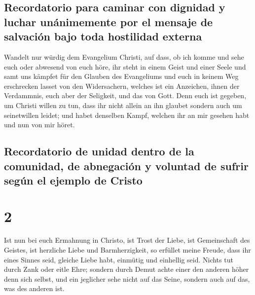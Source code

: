 \hypertarget{recordatorio-para-caminar-con-dignidad-y-luchar-unuxe1nimemente-por-el-mensaje-de-salvaciuxf3n-bajo-toda-hostilidad-externa}{%
\subsection{Recordatorio para caminar con dignidad y luchar unánimemente
por el mensaje de salvación bajo toda hostilidad
externa}\label{recordatorio-para-caminar-con-dignidad-y-luchar-unuxe1nimemente-por-el-mensaje-de-salvaciuxf3n-bajo-toda-hostilidad-externa}}

 Wandelt nur würdig dem Evangelium Christi, auf dass, ob
ich komme und sehe euch oder abwesend von euch höre, ihr steht in einem
Geist und einer Seele und samt uns kämpfet für den Glauben des
Evangeliums  und euch in keinem Weg erschrecken lasset
von den Widersachern, welches ist ein Anzeichen, ihnen der Verdammnis,
euch aber der Seligkeit, und das von Gott.  Denn euch ist
gegeben, um Christi willen zu tun, dass ihr nicht allein an ihn glaubet
sondern auch um seinetwillen leidet;  und habet denselben
Kampf, welchen ihr an mir gesehen habt und nun von mir höret.

\hypertarget{recordatorio-de-unidad-dentro-de-la-comunidad-de-abnegaciuxf3n-y-voluntad-de-sufrir-seguxfan-el-ejemplo-de-cristo}{%
\subsection{Recordatorio de unidad dentro de la comunidad, de abnegación
y voluntad de sufrir según el ejemplo de
Cristo}\label{recordatorio-de-unidad-dentro-de-la-comunidad-de-abnegaciuxf3n-y-voluntad-de-sufrir-seguxfan-el-ejemplo-de-cristo}}

\hypertarget{section-1}{%
\section{2}\label{section-1}}

 Ist nun bei euch Ermahnung in Christo, ist Trost der
Liebe, ist Gemeinschaft des Geistes, ist herzliche Liebe und
Barmherzigkeit,  so erfüllet meine Freude, dass ihr eines
Sinnes seid, gleiche Liebe habt, einmütig und einhellig seid.
 Nichts tut durch Zank oder eitle Ehre; sondern durch
Demut achte einer den anderen höher denn sich selbst,  und
ein jeglicher sehe nicht auf das Seine, sondern auch auf das, was des
anderen ist.

